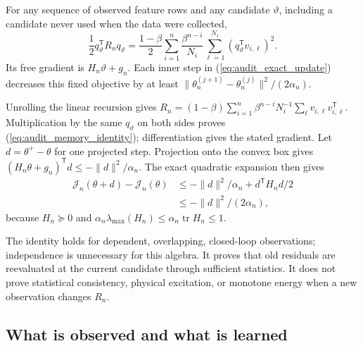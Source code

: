 \documentclass[journal]{IEEEtran}
\newcommand{\tr}{\operatorname{tr}}
\begin{document}
\begin{auditproposition}
\label{prop:audit_memory}
For any sequence of observed feature rows and any candidate $\vartheta$,
including a candidate never used when the data were collected,
\begin{equation}
 \frac12q_\vartheta^{\mathsf T}R_nq_\vartheta
 =\frac{1-\beta}{2}\sum_{i=1}^{n}\frac{\beta^{n-i}}{N_i}
   \sum_{\ell=1}^{N_i}(q_\vartheta^{\mathsf T}v_{i,\ell})^2.
 \label{eq:audit_memory_identity}
\end{equation}
Its free gradient is $H_n\vartheta+g_n$. Each inner step in
(\ref{eq:audit_exact_update}) decreases this fixed objective by at least
$\|\theta_n^{(j+1)}-\theta_n^{(j)}\|^2/(2\alpha_n)$.
\end{auditproposition}
\begin{IEEEproof}
Unrolling the linear recursion gives
$R_n=(1-\beta)\sum_{i=1}^n\beta^{n-i}N_i^{-1}
\sum_\ell v_{i,\ell}v_{i,\ell}^{\mathsf T}$.
Multiplication by the same $q_\vartheta$ on both sides proves
(\ref{eq:audit_memory_identity}); differentiation gives the stated
gradient. Let $d=\theta^+-\theta$ for one projected step. Projection onto
the convex box gives $(H_n\theta+g_n)^{\mathsf T}d\le-\|d\|^2/\alpha_n$.
The exact quadratic expansion then gives
\begin{align*}
 \mathcal J_n(\theta+d)-\mathcal J_n(\theta)
 &\le-\|d\|^2/\alpha_n+d^{\mathsf T}H_nd/2\\
 &\le-\|d\|^2/(2\alpha_n),
\end{align*}
because $H_n\succeq0$ and
$\alpha_n\lambda_{\max}(H_n)\le\alpha_n\tr H_n\le1$.
\end{IEEEproof}
The identity holds for dependent, overlapping, closed-loop observations;
independence is unnecessary for this algebra. It proves that old residuals
are reevaluated at the current candidate through sufficient statistics.
It does not prove statistical consistency, physical excitation, or monotone
energy when a new observation changes $R_n$.

\subsection{What is observed and what is learned}
\end{document}
